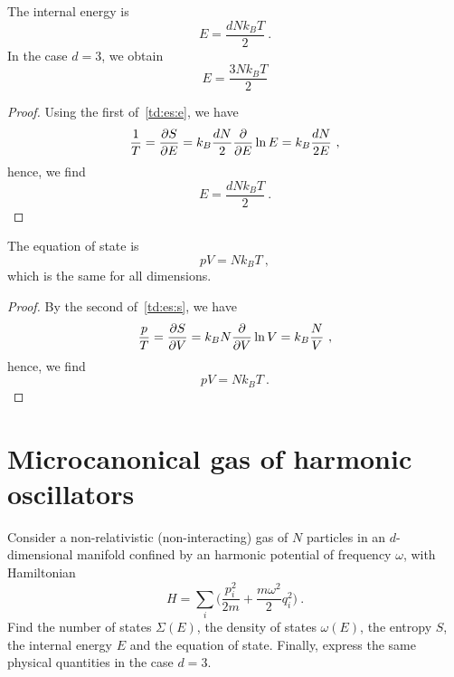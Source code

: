     The internal energy is 
    \begin{equation*}
        E = \frac{d N k_B T}{2} ~.
    \end{equation*}
    In the case $d = 3$, we obtain 
    \begin{equation*}
        E = \frac{3 N k_B T}{2}
    \end{equation*}
    \begin{proof}
        Using the first of~\eqref{td:es:e}, we have
        \begin{equation*}
            \frac{1}{T} = \frac{\partial S}{\partial E} = k_B \frac{dN}{2} \frac{\partial}{\partial E} \ln E = k_B \frac{dN}{2E} ~,
        \end{equation*}
        hence, we find
        \begin{equation*}
            E = \frac{d N k_B T}{2} ~.
        \end{equation*}
    \end{proof}
    The equation of state is  
    \begin{equation*}
        p V = N k_B T ~,
    \end{equation*}
    which is the same for all dimensions.
    \begin{proof}
        By the second of~\eqref{td:es:s}, we have
        \begin{equation*}
            \frac{p}{T} = \frac{\partial S}{\partial V} = k_B N \frac{\partial}{\partial V} \ln V = k_B \frac{N}{V}  ~,
        \end{equation*}
        hence, we find
        \begin{equation*}
            pV = N k_B T ~.
        \end{equation*}
    \end{proof}

\section{Microcanonical gas of harmonic oscillators}

    \begin{exercise}
        Consider a non-relativistic (non-interacting) gas of $N$ particles in an $d$-dimensional manifold confined by an harmonic potential of frequency $\omega$, with Hamiltonian 
        \begin{equation*}
            H = \sum_i \Big ( \frac{p^2_i}{2m} + \frac{m \omega^2}{2} q_i^2 \Big ) ~.
        \end{equation*}
        Find the number of states $\Sigma(E)$, the density of states $\omega(E)$, the entropy $S$, the internal energy $E$ and the equation of state. Finally, express the same physical quantities in the case $d = 3$.
    \end{exercise}

